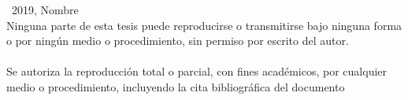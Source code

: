 \documentclass[spanish, a4paper, 12pt, twoside, openany]{book}
\numberwithin{equation}{section}                %
\def\biblio{\clearpage} %
\begin{document}
\def\biblio{}   %

\vfill

\thispagestyle{empty}
\mbox{}                         %
\vfill                          %
\textcopyright\ 2019, Nombre \\ %
Ninguna parte de esta tesis puede reproducirse o transmitirse bajo ninguna forma o por ningún medio o procedimiento, sin permiso por escrito del autor.\\\\
Se autoriza la reproducción total o parcial, con fines académicos, por cualquier medio o procedimiento, incluyendo la cita bibliográfica del documento
\vspace{1cm}    %
\restoregeometry %








\restoregeometry        %


\end{document}

